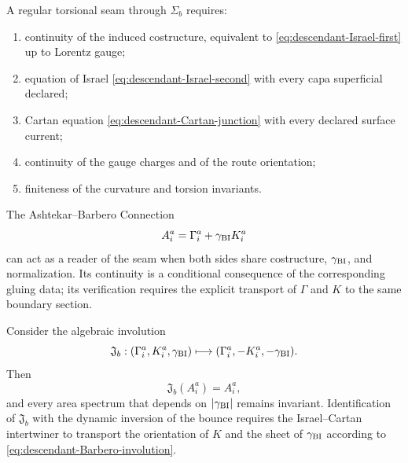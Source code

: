 \begin{criterion}
\label{crit:descendant-Israel-Cartan}
A regular torsional seam through \(\Sigma_b\) requires:
\begin{enumerate}[label=\roman*)]
 \item continuity of the induced costructure, equivalent to
       \cref{eq:descendant-Israel-first} up to Lorentz gauge;
 \item equation of Israel \cref{eq:descendant-Israel-second} with every capa
       superficial declared;
 \item Cartan equation \cref{eq:descendant-Cartan-junction} with every
       declared surface current;
 \item continuity of the gauge charges and of the route orientation;
 \item finiteness of the curvature and torsion invariants.
\end{enumerate}
\end{criterion}

The Ashtekar--Barbero Connection
\begin{equation}
 A_i^a=\Gamma_i^a+\gamma_{\rm BI}K_i^a
 \label{eq:descendant-Barbero-connection}
\end{equation}
can act as a reader of the seam when both sides share
costructure, \(\gamma_{\rm BI}\), and normalization. Its continuity is a
conditional consequence of the corresponding gluing data; its
verification requires the explicit transport of \(\Gamma\) and \(K\) to the
same boundary section.

\begin{proposition}
\label{prop:descendant-Barbero-involution}
Consider the algebraic involution
\begin{equation}
 \mathfrak J_b:
 (\Gamma_i^a,K_i^a,\gamma_{\rm BI})
 \longmapsto
 (\Gamma_i^a,-K_i^a,-\gamma_{\rm BI}).
 \label{eq:descendant-Barbero-involution}
\end{equation}
Then
\begin{equation}
 \mathfrak J_b(A_i^a)=A_i^a,
 \label{eq:descendant-Barbero-A-invariant}
\end{equation}
and every area spectrum that depends on \(|\gamma_{\rm BI}|\) remains
invariant. Identification of \(\mathfrak J_b\) with the dynamic inversion
of the bounce requires the Israel--Cartan intertwiner to transport
the orientation of \(K\) and the sheet of \(\gamma_{\rm BI}\) according to
\cref{eq:descendant-Barbero-involution}.
\end{proposition}

